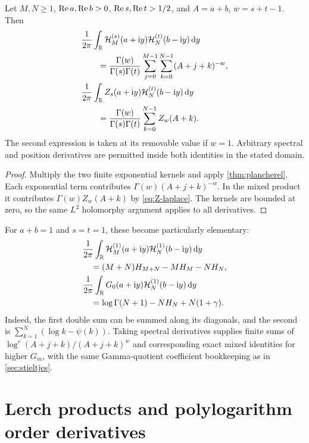 \begin{theorem}\label{thm:harmonic}
Let $M,N\ge1$, $\operatorname{Re} a,\operatorname{Re} b>0$, $\operatorname{Re} s,\operatorname{Re} t>1/2$, and
$A=a+b$, $w=s+t-1$. Then
\begin{align}
 &\frac1{2\pi}\int_{\mathbb R}\mathcal H_M^{(s)}(a+\mathrm i y)
                           \mathcal H_N^{(t)}(b-\mathrm i y)\,\mathrm d y\notag\\
 &\qquad=\frac{\Gamma(w)}{\Gamma(s)\Gamma(t)}
       \sum_{j=0}^{M-1}\sum_{k=0}^{N-1}(A+j+k)^{-w},\label{eq:HH-pair}\\
 &\frac1{2\pi}\int_{\mathbb R}Z_s(a+\mathrm i y)
                           \mathcal H_N^{(t)}(b-\mathrm i y)\,\mathrm d y\notag\\
 &\qquad=\frac{\Gamma(w)}{\Gamma(s)\Gamma(t)}
                         \sum_{k=0}^{N-1}Z_w(A+k).\label{eq:ZH-pair}
\end{align}
The second expression is taken at its removable value if $w=1$.
Arbitrary spectral and position derivatives are permitted inside both
identities in the stated domain.
\end{theorem}
\begin{proof}
Multiply the two finite exponential kernels and apply
\cref{thm:plancherel}. Each exponential term contributes
$\Gamma(w)(A+j+k)^{-w}$. In the mixed product it contributes
$\Gamma(w)Z_w(A+k)$ by \eqref{eq:Z-laplace}.
The kernels are bounded at zero, so the same $L^2$ holomorphy argument
applies to all derivatives.
\end{proof}

For $a+b=1$ and $s=t=1$, these become particularly elementary:
\begin{align}
 &\frac1{2\pi}\int_{\mathbb R}\mathcal H_M^{(1)}(a+\mathrm i y)
                        \mathcal H_N^{(1)}(b-\mathrm i y)\,\mathrm d y\notag\\
 &\quad=(M+N)H_{M+N}-MH_M-NH_N,\label{eq:HH-elementary}\\
 &\frac1{2\pi}\int_{\mathbb R}G_0(a+\mathrm i y)
                        \mathcal H_N^{(1)}(b-\mathrm i y)\,\mathrm d y\notag\\
 &\quad=\log\Gamma(N+1)-NH_N+N(1+\gamma).
               \label{eq:GH-elementary}
\end{align}
Indeed, the first double sum can be summed along its diagonals, and the
second is $\sum_{k=1}^N(\log k-\psi(k))$.
Taking spectral derivatives supplies finite sums of
$\log^r(A+j+k)/(A+j+k)^w$ and corresponding exact mixed identities for
higher $G_m$, with the same Gamma-quotient coefficient bookkeeping as
in \cref{sec:stieltjes}.

\section{Lerch products and polylogarithm order derivatives}
\label{sec:lerch}

